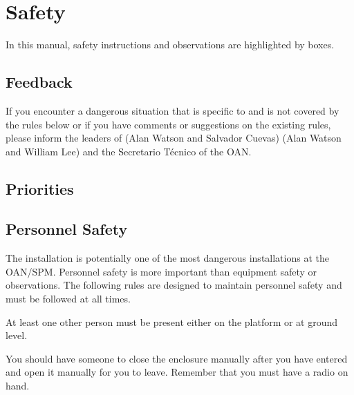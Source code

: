 \chapter{Safety}
\label{chapter:safety}


In this manual, safety instructions and observations are highlighted by boxes.
\section{Feedback}

If you encounter a dangerous situation that is specific to {\projectname} and is not covered by the rules below or if you have comments or suggestions on the existing rules, please inform the leaders of {\projectname}
\ifcoatli
(Alan Watson and Salvador Cuevas)
\fi
\ifddoti 
(Alan Watson and William Lee) 
\fi
and the Secretario Técnico of the OAN.

\section{Priorities}


\section{Personnel Safety}

The {\projectname} installation is potentially one of the most dangerous installations at the OAN/SPM. Personnel safety is more important than equipment safety or observations. The following  rules are designed to maintain personnel safety and must be followed at all times.


At least one other person must be present either on the platform or at ground level.


You should have someone to close the enclosure manually after you have entered and open it manually for you to leave. Remember that you must have a radio on hand.

